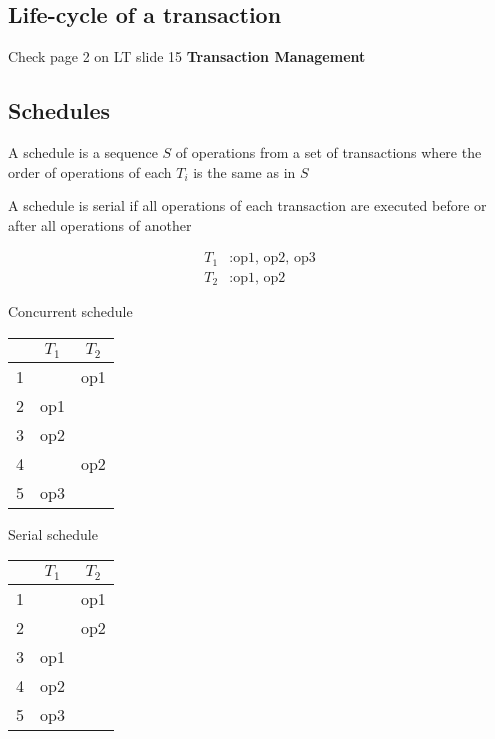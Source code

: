 \documentclass{article}
\begin{document}
\subsection{Life-cycle of a transaction}
Check page 2 on LT slide 15 \textbf{Transaction Management}
\subsection{Schedules}
A schedule is a sequence $S$ of operations from a set of transactions
where the order of operations of each $T_i$ is the same as in $S$

A schedule is serial if all operations of each transaction are executed before or after all operations of another

\begin{multicols}{3}
  \[\begin{split}
      T_1&: \text{op1, op2, op3}\\
      T_2&: \text{op1, op2}
    \end{split}\]
  \linebreak
  \linebreak
  \begin{center}
    Concurrent schedule\\
    \begin{tabular}{c|c|c}
        & $T_1$ & $T_2$ \\ \hline
      1 &       & op1   \\
      2 & op1   &       \\
      3 & op2   &       \\
      4 &       & op2   \\
      5 & op3   &       \\
    \end{tabular}
  \end{center}
  \begin{center}
    Serial schedule\\
    \begin{tabular}{c|c|c}
        & $T_1$ & $T_2$ \\ \hline
      1 &       & op1   \\
      2 &       & op2   \\
      3 & op1   &       \\
      4 & op2   &       \\
      5 & op3   &
    \end{tabular}
  \end{center}
\end{multicols}
\end{document}
